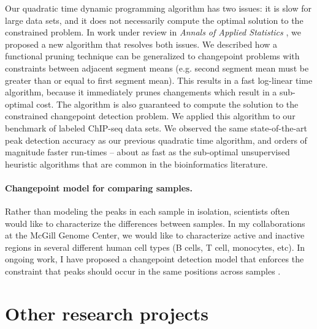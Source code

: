 \documentclass{article}
\begin{document}
Our quadratic time dynamic programming algorithm has two issues: it is
slow for large data sets, and it does not necessarily compute the
optimal solution to the constrained problem. In work under review in
\emph{Annals of Applied Statistics}
\citep{Hocking-constrained-changepoint-detection}, we proposed a new
algorithm that resolves both issues. We described how a functional
pruning technique can be generalized to changepoint problems with
constraints between adjacent segment means (e.g. second segment mean
must be greater than or equal to first segment mean). This results in a fast
log-linear time algorithm, because it immediately prunes changements
which result in a sub-optimal cost. The algorithm is also guaranteed
to compute the solution to the constrained changepoint detection
problem. We applied this algorithm to our benchmark of labeled
ChIP-seq data sets. We observed the same state-of-the-art peak
detection accuracy as our previous quadratic time algorithm, and
orders of magnitude faster run-times -- about as fast as the
sub-optimal unsupervised heuristic algorithms that are common 
in the bioinformatics literature.

\paragraph{Changepoint model for comparing samples.}
Rather than modeling the peaks in each sample in isolation, scientists
often would like to characterize the differences between samples. In
my collaborations at the McGill Genome Center, we would like to
characterize active and inactive regions in several different human
cell types (B cells, T cell, monocytes, etc). In ongoing work, I have
proposed a changepoint detection model that enforces the constraint that peaks
should occur in the same positions across samples
\citep{HOCKING-PeakSegJoint}.

\section{Other research projects}

\end{document}
